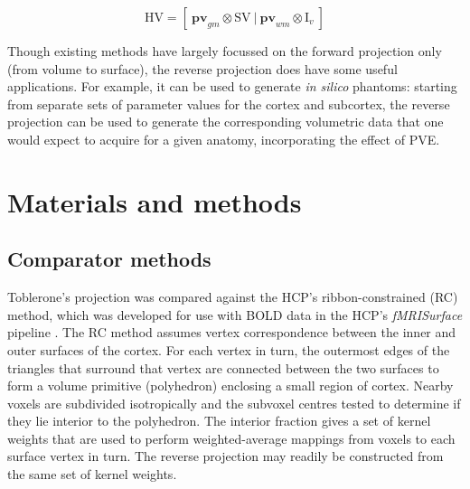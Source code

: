 \documentclass[review]{elsarticle}
\newcommand{\mat}[1]{\mathrm{#1}}
\renewcommand{\vec}[1]{\mathbf{#1}}
\begin{document}
\begin{equation}
\mathrm{HV} = [\ \vec{pv}_{gm} \otimes \mat{SV} \ | \ \vec{pv}_{wm} \otimes \mat{I}_v \ ]
\end{equation}

Though existing methods have largely focussed on the forward projection only (from volume to surface), the reverse projection does have some useful applications. For example, it can be used to generate \textit{in silico} phantoms: starting from separate sets of parameter values for the cortex and subcortex, the reverse projection can be used to generate the corresponding volumetric data that one would expect to acquire for a given anatomy, incorporating the effect of PVE. 

\section{Materials and methods}

\subsection{Comparator methods}
Toblerone's projection was compared against the HCP's ribbon-constrained (RC) method, which was developed for use with BOLD data in the HCP’s \textit{fMRISurface} pipeline \cite{Glasser2013}. The RC method assumes vertex correspondence between the inner and outer surfaces of the cortex. For each vertex in turn, the outermost edges of the triangles that surround that vertex are connected between the two surfaces to form a volume primitive (polyhedron) enclosing a small region of cortex. Nearby voxels are subdivided isotropically and the subvoxel centres tested to determine if they lie interior to the polyhedron. The interior fraction gives a set of kernel weights that are used to perform weighted-average mappings from voxels to each surface vertex in turn. The reverse projection may readily be constructed from the same set of kernel weights. 
\end{document}
